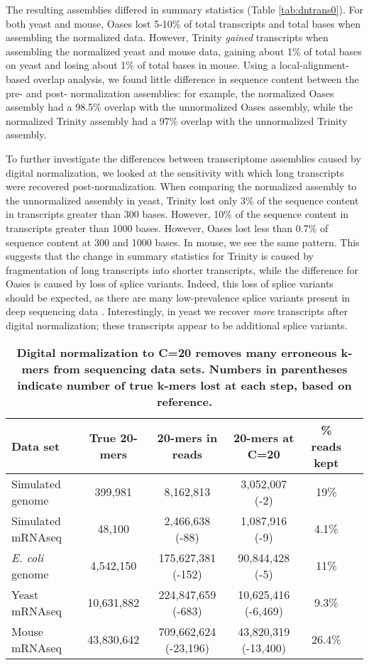 The resulting assemblies differed in summary statistics (Table
\ref{tab:dntrans0}).  For both yeast and mouse, Oases lost 5-10\% of total
transcripts and total bases when assembling the normalized data.  However,
Trinity {\em gained} transcripts when assembling the normalized yeast and mouse
data, gaining about 1\% of total bases on yeast and losing about 1\% of total
bases in mouse.  Using a local-alignment-based overlap analysis, 
we found little difference in sequence content between the pre- and post-
normalization assemblies: for example, the normalized Oases assembly had a
98.5\% overlap with the unnormalized Oases assembly, while the normalized
Trinity assembly had a 97\% overlap with the unnormalized Trinity assembly.

To further investigate the differences between transcriptome assemblies caused
by digital normalization, we looked at the sensitivity with which long
transcripts were recovered post-normalization.  When comparing the normalized
assembly to the unnormalized assembly in yeast, Trinity lost only 3\% of the
sequence content in transcripts greater than 300 bases. However, 10\% of the
sequence content in transcripts greater than 1000 bases.  However, Oases lost
less than 0.7\% of sequence content at 300 and 1000 bases.  In mouse, we see
the same pattern. This suggests that the change in summary statistics for
Trinity is caused by fragmentation of long transcripts into shorter
transcripts, while the difference for Oases is caused by loss of splice
variants.  Indeed, this loss of splice variants should be expected, as there
are many low-prevalence splice variants present in deep sequencing data
\cite{pubmed21151575}. Interestingly, in yeast we recover {\em more}
transcripts after digital normalization; these transcripts appear to be
additional splice variants.




\begin{table}[!ht]
\centering
\resizebox{16cm}{!} {

\begin{tabular}{|l|c|c|c|c|c|}
\hline
Data set & True 20-mers & 20-mers in reads & 20-mers at C=20 & \% reads kept\\
\hline 
Simulated genome & 399,981 & 8,162,813 & 3,052,007 (-2) & 19\% \\
Simulated mRNAseq & 48,100 & 2,466,638 (-88) & 1,087,916 (-9) & 4.1\% \\
{\em E. coli} genome & 4,542,150 & 175,627,381 (-152) & 90,844,428 (-5) & 11\% \\
Yeast mRNAseq & 10,631,882 & 224,847,659 (-683) & 10,625,416 (-6,469) & 9.3\% \\
Mouse mRNAseq & 43,830,642 & 709,662,624 (-23,196) & 43,820,319 (-13,400) & 26.4\% \\
\hline
\end{tabular}
}
\caption{
\bf{Digital normalization to C=20 removes many erroneous k-mers from sequencing data sets.  Numbers
in parentheses indicate number of true k-mers lost at each step, based on reference.}}
\label{tab:normC20}
\end{table}


